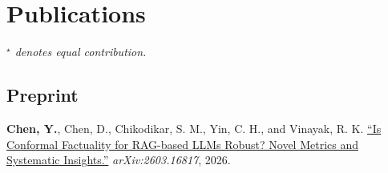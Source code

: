 \documentclass[11pt,letterpaper]{article}
\newcommand{\me}{\textbf{Chen, Y.}}
\begin{document}
\section*{Publications}
\textit{$^\star$ denotes equal contribution.}

\subsection*{Preprint}
\begin{pubs}
\item \me, Chen, D., Chikodikar, S. M., Yin, C. H., and Vinayak, R. K.
\href{https://arxiv.org/abs/2603.16817}{``Is Conformal Factuality for RAG-based LLMs Robust? Novel Metrics and Systematic Insights.''}
\textit{arXiv:2603.16817}, 2026.
\end{pubs}
\end{document}
